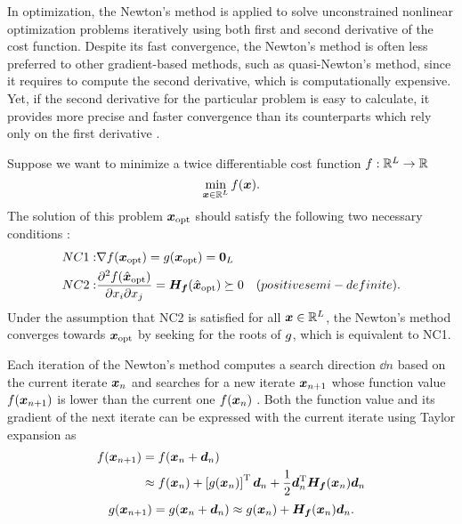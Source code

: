 In optimization, the Newton's method is applied to solve unconstrained nonlinear optimization problems iteratively using both first and second derivative of the cost function. Despite its fast convergence, the Newton's method is often less preferred to other gradient-based methods, such as quasi-Newton's method, since it requires to compute the second derivative, which is computationally expensive. Yet, if the second derivative for the particular problem is easy to calculate, it provides more precise and faster convergence than its counterparts which rely only on the first derivative \cite{Nocedal06NumOpt}. \par

Suppose we want to minimize a twice differentiable cost function $f: {\mathbb{R}}^{L} \rightarrow {\mathbb{R}}$ 
\begin{equation}
	\min_{\bm{x} \in {\mathbb{R}}^{L}} f (\bm{x}).
\end{equation}
The solution of this problem $\bm{x}_{\operatorname{opt}}$ should satisfy the following two necessary conditions \cite{Bonnans06NumOpt}:
\begin{eqnarray*} 
	\relax{NC1:} & \nabla f (\bm{x}_{\operatorname{opt}}) = g (\bm{x}_{\operatorname{opt}}) = \bm{0}_{L}\\
	\relax{NC2:} & \frac{\partial^{2} f (\hat{\bm{x}}_{\operatorname{opt}})}{\partial x_{i} \partial x_{j}} = \bm{H_{f}} (\hat{\bm{x}}_{\operatorname{opt}}) \succeq 0 & \relax{(positive semi-definite)}.
\end{eqnarray*}
Under the assumption that NC2 is satisfied for all $\bm{x} \in {\mathbb{R}}^{L}$, the Newton's method converges towards $\bm{x}_{\operatorname{opt}}$ by seeking for the roots of $g$, which is equivalent to NC1. \par

Each iteration of the Newton's method computes a search direction $\dd{n}$ based on the current iterate $\bm{x}_{n}$ and searches for a new iterate $\bm{x}_{n + 1}$ whose function value $f (\bm{x}_{n+1})$ is lower than the current one $f (\bm{x}_{n})$ \cite{Nocedal06NumOpt}. Both the function value and its gradient of the next iterate can be expressed with the current iterate using Taylor expansion as
\begin{align} \label{eq:Taylor_fx}
	f (\iter{n + 1})
	& = f (\iter{n} +  \dd{n}) \nonumber \\
	& \approx f (\iter{n}) + \left[ \gradf (\iter{n}) \right]^{\T} \dd{n} + \frac{1}{2} \dd{n}^{\T} \Hess (\iter{n}) \dd{n}
\end{align}
%
\begin{equation} \label{eq:Taylor_gx}
	\gradf (\iter{n + 1}) = \gradf (\iter{n} +  \dd{n}) \approx \gradf (\iter{n}) + \Hess (\iter{n}) \dd{n}.
\end{equation} \par

